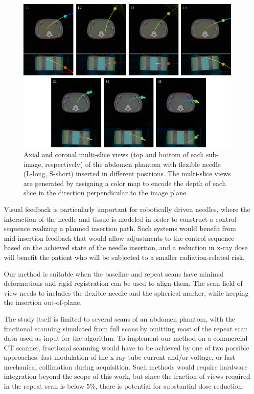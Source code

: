 \begin{figure}
\centering
\includegraphics[width=\textwidth]{multislices.png}
\caption{\small{Axial and coronal multi-slice views (top and bottom of each sub-image, respectively) of the abdomen phantom with flexible needle (L-long, S-short) inserted in different positions. The multi-slice views are generated by assigning a color map to encode the depth of each slice in the direction perpendicular to the image plane.}}
\label{multislices_fig}
\end{figure}

Visual feedback is particularly important for robotically driven needles, where the interaction of the needle and tissue is modeled in order to construct a control sequence realizing a planned insertion path. Such systems would benefit from mid-insertion feedback that would allow adjustments to the control sequence based on the achieved state of the needle insertion, and a reduction in x-ray dose will benefit the patient who will be subjected to a smaller radiation-related risk.


Our method is suitable when the baseline and repeat scans have minimal deformations and rigid registration can be used to align them. The scan field of view needs to includes the flexible needle and the spherical marker, while keeping the insertion out-of-plane.

The study itself is limited to several scans of an abdomen phantom, with the fractional scanning simulated from full scans by omitting most of the repeat scan data used as input for the algorithm. To implement our method on a commercial CT scanner, fractional scanning would have to be achieved by one of two possible approaches: fast modulation of the x-ray tube current and/or voltage, or fast mechanical collimation during acquisition. Such methods would require hardware integration beyond the scope of this work, but since the fraction of views required in the repeat scan is below 5\%, there is potential for substantial dose reduction.


